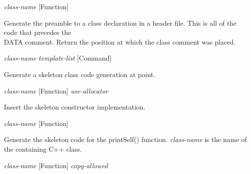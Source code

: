 \vspace{1em}
\noindent
{}
\usebox{\funcname}\emph{class-name}
 \hfill [Function]
\hspace*{\wd\funcname}

\begin{doc-string}
Generate the preamble to a class declaration in a header file.  This is all
of the code that precedes the \\ DATA comment.  Return the position at which
the class comment was placed.
\end{doc-string}

\vspace{1em}
\noindent
{}
\usebox{\funcname}\emph{class-name} \emph{template-list}
 \hfill [Command]
\hspace*{\wd\funcname}

\begin{doc-string}
Generate a skeleton class code generation at point.
\end{doc-string}

\vspace{1em}
\noindent
{}
\usebox{\funcname}\emph{class-name}
 \hfill [Function]
\hspace*{\wd\funcname}\emph{use-allocator}

\begin{doc-string}
Insert the skeleton constructor implementation.
\end{doc-string}

\vspace{1em}
\noindent
{}
\usebox{\funcname}\emph{class-name}
 \hfill [Function]
\hspace*{\wd\funcname}

\begin{doc-string}
Generate the skeleton code for the printSelf() function.
\emph{class-name} is the name of the containing C++ class.
\end{doc-string}

\vspace{1em}
\noindent
{}
\usebox{\funcname}\emph{class-name}
 \hfill [Function]
\hspace*{\wd\funcname}\emph{copy-allowed}
\hspace*{\wd\funcname}

